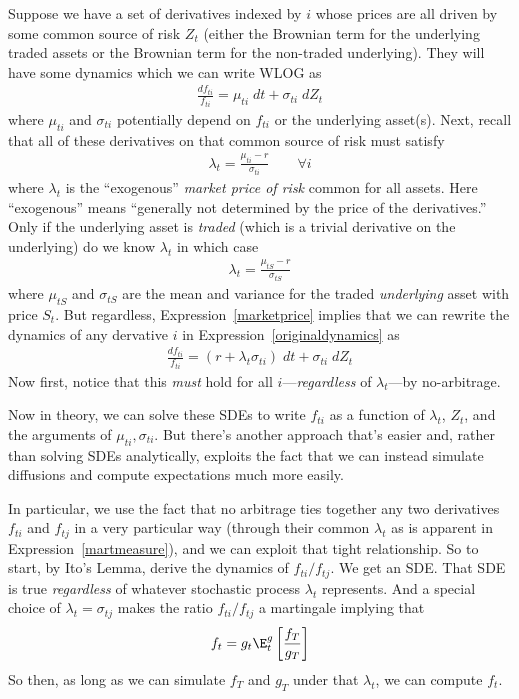 \documentclass[12pt]{article}
\theoremstyle{plain}
\theoremstyle{definition}
\theoremstyle{remark}
\begin{document}
Suppose we have a set of derivatives indexed by $i$ whose prices are all
driven by some common source of risk $Z_t$ (either the Brownian term for
the underlying traded assets or the Brownian term for the non-traded
underlying). They will have some dynamics which we can write WLOG as
\begin{align}
  \frac{df_{ti}}{f_{ti}}
  =
  \mu_{ti}\;dt
  +\sigma_{ti}\;dZ_t
  \label{originaldynamics}
\end{align}
where $\mu_{ti}$ and $\sigma_{ti}$ potentially depend on $f_{ti}$ or the
underlying asset(s).
Next, recall that all of these derivatives on that common source of risk
must satisfy
\begin{align}
  \lambda_{t}=\frac{\mu_{ti}-r}{\sigma_{ti}}
  \qquad
  \forall i
  \label{marketprice}
\end{align}
where $\lambda_t$ is the ``exogenous'' \emph{market price of risk}
common for all assets. Here ``exogenous'' means ``generally not
determined by the price of the derivatives.'' Only if the underlying
asset is \emph{traded} (which is a trivial derivative on the underlying)
do we know $\lambda_t$ in which case
\begin{align*}
  \lambda_{t}=\frac{\mu_{tS}-r}{\sigma_{tS}}
\end{align*}
where $\mu_{tS}$ and $\sigma_{tS}$ are the mean and variance for the
traded \emph{underlying} asset with price $S_t$.
But regardless, Expression~\ref{marketprice} implies that we can rewrite
the dynamics of any dervative $i$ in Expression~\ref{originaldynamics} as
\begin{align}
  \frac{df_{ti}}{f_{ti}}
  =
  (r+\lambda_t\sigma_{ti})
  \;dt
  +\sigma_{ti}\;dZ_t
  \label{martmeasure}
\end{align}
Now first, notice that this \emph{must} hold for all
$i$---\emph{regardless} of $\lambda_t$---by no-arbitrage.

Now in theory, we can solve these SDEs to write $f_{ti}$ as a function
of $\lambda_t$, $Z_t$, and the arguments of $\mu_{ti},\sigma_{ti}$.
But there's another approach that's easier and, rather than solving SDEs
analytically, exploits the fact that we can instead simulate diffusions
and compute expectations much more easily.

In particular, we use the fact that no arbitrage ties together any two
derivatives $f_{ti}$ and $f_{tj}$ in a very particular way (through
their common $\lambda_t$ as is apparent in
Expression~\ref{martmeasure}), and we can exploit that tight
relationship.
So to start, by Ito's Lemma, derive the dynamics of
$f_{ti}/f_{tj}$. We get an SDE.
That SDE is true \emph{regardless} of whatever stochastic process
$\lambda_t$ represents. And a special choice of $\lambda_t=\sigma_{tj}$
makes the ratio $f_{ti}/f_{tj}$ a martingale implying that
\begin{align*}
  f_t = g_t\E_t^g\left[\frac{f_T}{g_T}\right]
\end{align*}
So then, as long as we can simulate $f_T$ and $g_T$ under that
$\lambda_t$, we can compute $f_t$.
\end{document}
